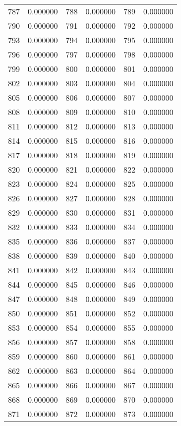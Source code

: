 \documentclass[12pt]{article}
\begin{document}
\begin{longtable}{@{}cc|cc|cc@{}}
787 & 0.000000 & 788 & 0.000000 & 789 & 0.000000 \\
790 & 0.000000 & 791 & 0.000000 & 792 & 0.000000 \\
793 & 0.000000 & 794 & 0.000000 & 795 & 0.000000 \\
796 & 0.000000 & 797 & 0.000000 & 798 & 0.000000 \\
799 & 0.000000 & 800 & 0.000000 & 801 & 0.000000 \\
802 & 0.000000 & 803 & 0.000000 & 804 & 0.000000 \\
805 & 0.000000 & 806 & 0.000000 & 807 & 0.000000 \\
808 & 0.000000 & 809 & 0.000000 & 810 & 0.000000 \\
811 & 0.000000 & 812 & 0.000000 & 813 & 0.000000 \\
814 & 0.000000 & 815 & 0.000000 & 816 & 0.000000 \\
817 & 0.000000 & 818 & 0.000000 & 819 & 0.000000 \\
820 & 0.000000 & 821 & 0.000000 & 822 & 0.000000 \\
823 & 0.000000 & 824 & 0.000000 & 825 & 0.000000 \\
826 & 0.000000 & 827 & 0.000000 & 828 & 0.000000 \\
829 & 0.000000 & 830 & 0.000000 & 831 & 0.000000 \\
832 & 0.000000 & 833 & 0.000000 & 834 & 0.000000 \\
835 & 0.000000 & 836 & 0.000000 & 837 & 0.000000 \\
838 & 0.000000 & 839 & 0.000000 & 840 & 0.000000 \\
841 & 0.000000 & 842 & 0.000000 & 843 & 0.000000 \\
844 & 0.000000 & 845 & 0.000000 & 846 & 0.000000 \\
847 & 0.000000 & 848 & 0.000000 & 849 & 0.000000 \\
850 & 0.000000 & 851 & 0.000000 & 852 & 0.000000 \\
853 & 0.000000 & 854 & 0.000000 & 855 & 0.000000 \\
856 & 0.000000 & 857 & 0.000000 & 858 & 0.000000 \\
859 & 0.000000 & 860 & 0.000000 & 861 & 0.000000 \\
862 & 0.000000 & 863 & 0.000000 & 864 & 0.000000 \\
865 & 0.000000 & 866 & 0.000000 & 867 & 0.000000 \\
868 & 0.000000 & 869 & 0.000000 & 870 & 0.000000 \\
871 & 0.000000 & 872 & 0.000000 & 873 & 0.000000 \\

\end{longtable}
\end{document}
